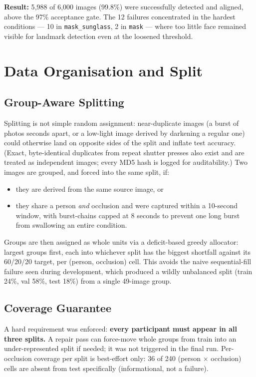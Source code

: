 \documentclass[11pt]{article}
\begin{document}
\textbf{Result:} 5{,}988 of 6{,}000 images (99.8\%) were successfully detected and aligned, above the 97\% acceptance gate. The 12 failures concentrated in the hardest conditions --- 10 in \texttt{mask\_sunglass}, 2 in \texttt{mask} --- where too little face remained visible for landmark detection even at the loosened threshold.

\section{Data Organisation and Split}
\label{sec:split}

\subsection{Group-Aware Splitting}

Splitting is not simple random assignment: near-duplicate images (a burst of photos seconds apart, or a low-light image derived by darkening a regular one) could otherwise land on opposite sides of the split and inflate test accuracy. (Exact, byte-identical duplicates from repeat shutter presses also exist and are treated as independent images; every MD5 hash is logged for auditability.) Two images are grouped, and forced into the same split, if:
\begin{itemize}
\item they are derived from the same source image, or
\item they share a person \emph{and} occlusion and were captured within a 10-second window, with burst-chains capped at 8 seconds to prevent one long burst from swallowing an entire condition.
\end{itemize}
Groups are then assigned as whole units via a deficit-based greedy allocator: largest groups first, each into whichever split has the biggest shortfall against its 60/20/20 target, per (person, occlusion) cell. This avoids the naive sequential-fill failure seen during development, which produced a wildly unbalanced split (train 24\%, val 58\%, test 18\%) from a single 49-image group.

\subsection{Coverage Guarantee}

A hard requirement was enforced: \textbf{every participant must appear in all three splits.} A repair pass can force-move whole groups from train into an under-represented split if needed; it was not triggered in the final run. Per-occlusion coverage per split is best-effort only: 36 of 240 (person $\times$ occlusion) cells are absent from test specifically (informational, not a failure).
\end{document}

